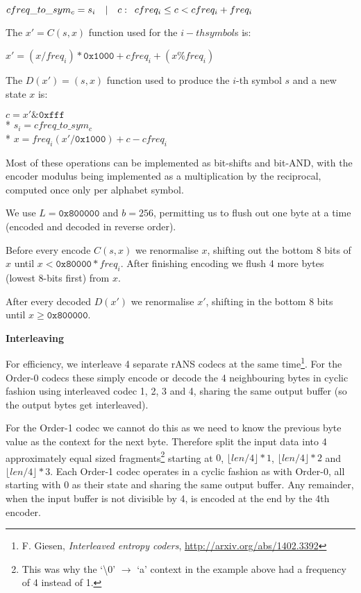 \documentclass[a4paper]{article}
\begin{document}
{
\setlength{\parindent}{1cm}
\indent   $cfreq\_to\_sym_c = s_{i} \quad | \quad c: \enskip cfreq_i \leq c <
cfreq_i + freq_i$
}


The $x' = C(s,x)$ function used for the ${i}-th symbol ${s} is:

{
\setlength{\parindent}{1cm}
\indent    $x' = (x/freq_i) * \mathtt{0x1000} + cfreq_i + (x\%freq_i)$
}

The $D(x') = (s,x)$ function used to produce the $i$-th symbol $s$ and
a new state $x$ is:

{
\setlength{\parindent}{1cm}
\indent    $c = x' \& \mathtt{0xfff}$\\*
\indent    $s_{i} = cfreq\_to\_sym_{c}$\\*
\indent    $x = freq_{i} (x' / \mathtt{0x1000}) + c - cfreq_{i}$
}

Most of these operations can be implemented as bit-shifts and bit-AND,
with the encoder modulus being implemented as a multiplication by the
reciprocal, computed once only per alphabet symbol.

We use $L = \mathtt{0x800000}$ and $b = 256$, permitting us to flush out one byte
at a time (encoded and decoded in reverse order).

Before every encode $C(s,x)$ we renormalise $x$, shifting out the bottom 8
bits of $x$ until $x < \mathtt{0x80000} * freq_i$.  After finishing encoding we
flush 4 more bytes (lowest 8-bits first) from $x$.

After every decoded $D(x')$ we renormalise $x'$, shifting in the bottom 8
bits until $x \geq \mathtt{0x800000}$.


\textbf{Interleaving}

For efficiency, we interleave 4 separate rANS codecs at the same
time\footnote{F. Giesen, \textit{Interleaved entropy coders},
  \url{http://arxiv.org/abs/1402.3392}}.  For the Order-0 codecs these
simply encode or decode the 4 neighbouring bytes in cyclic fashion
using interleaved codec 1, 2, 3 and 4, sharing the same output buffer
(so the output bytes get interleaved).

For the Order-1 codec we cannot do this as we need to know the
previous byte value as the context for the next byte.  Therefore split
the input data into 4 approximately equal sized
fragments\footnote{This was why the `\textbackslash0' $\to$ `a'
  context in the example above had a frequency of 4 instead of 1.}
starting at $0$, $\lfloor{}len/4\rfloor{}*1$,
$\lfloor{}len/4\rfloor{}*2$ and $\lfloor{}len/4\rfloor{}*3$.  Each
Order-1 codec operates in a cyclic fashion as with Order-0, all
starting with 0 as their state and sharing the same output buffer. Any
remainder, when the input buffer is not divisible by 4, is encoded at
the end by the 4th encoder.
\end{document}
